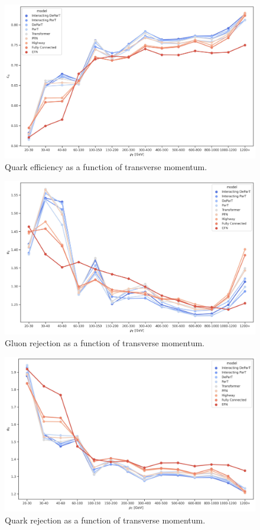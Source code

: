 \begin{figure}[htb]
    \centering
    \includegraphics[width=0.95\linewidth]{src/plots/results/pT_dep/quark_efficiency.jpg}
    \caption{Quark efficiency as a function of transverse momentum.}
    \label{fig:quark_eff_pt}
\end{figure}

\begin{figure}[htb]
    \centering
    \includegraphics[width=0.95\linewidth]{src/plots/results/pT_dep/gluon_rejection.jpg}
    \caption{Gluon rejection as a function of transverse momentum.}
    \label{fig:gluon_rej_pt}
\end{figure}

\begin{figure}[htb]
    \centering
    \includegraphics[width=0.95\linewidth]{src/plots/results/pT_dep/quark_rejection.jpg}
    \caption{Quark rejection as a function of transverse momentum.}
    \label{fig:quark_rej_pt}
\end{figure}

